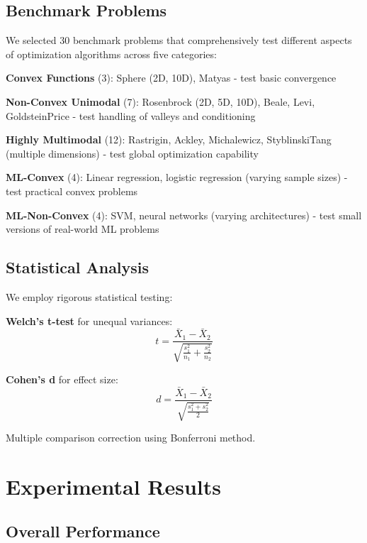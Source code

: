 \hypertarget{benchmark-problems}{%
\subsection{Benchmark Problems}\label{benchmark-problems}}

We selected 30 benchmark problems that comprehensively test different aspects of optimization algorithms across five categories:

\textbf{Convex Functions} (3): Sphere (2D, 10D), Matyas - test basic convergence

\textbf{Non-Convex Unimodal} (7): Rosenbrock (2D, 5D, 10D), Beale, Levi, GoldsteinPrice - test handling of valleys and conditioning

\textbf{Highly Multimodal} (12): Rastrigin, Ackley, Michalewicz, StyblinskiTang (multiple dimensions) - test global optimization capability

\textbf{ML-Convex} (4): Linear regression, logistic regression (varying sample sizes) - test practical convex problems

\textbf{ML-Non-Convex} (4): SVM, neural networks (varying architectures) - test small versions of real-world ML problems

\hypertarget{statistical-analysis}{%
\subsection{Statistical Analysis}\label{statistical-analysis}}

We employ rigorous statistical testing:

\textbf{Welch's t-test} for unequal variances:
\[t = \frac{\bar{X}_1 - \bar{X}_2}{\sqrt{\frac{s_1^2}{n_1} + \frac{s_2^2}{n_2}}}\]

\textbf{Cohen's d} for effect size:
\[d = \frac{\bar{X}_1 - \bar{X}_2}{\sqrt{\frac{s_1^2 + s_2^2}{2}}}\]

Multiple comparison correction using Bonferroni method.

\hypertarget{experimental-results}{%
\section{Experimental Results}\label{experimental-results}}

\hypertarget{overall-performance}{%
\subsection{Overall Performance}\label{overall-performance}}

